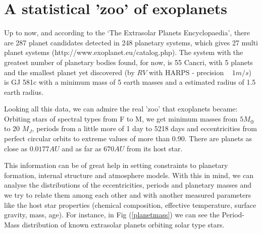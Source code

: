 \documentclass[dvips,12pt,a4paper]{report}
\begin{document}

\section {A statistical 'zoo' of exoplanets}

\indent Up to now, and according to the `The Extrasolar Planets Encyclopaedia', there are 287 planet candidates detected in 248 planetary systems, which gives 27 multi planet systems (http://www.exoplanet.eu/catalog.php). The system with the greatest number of planetary bodies found, for now, is 55 Cancri, with 5 planets \citep{Fischer-2008} and the smallest planet yet discovered (by $RV$ with HARPS - precision ~ $1m/s$) is GJ 581c \citep{Udry-2007b} with a minimum mass of 5 earth masses and a estimated radius of 1.5 earth radius. 

Looking all this data, we can admire the real 'zoo' that exoplanets became: Orbiting stars of spectral types from F to M, we get minimum masses from $5 M_{\oplus}$ to 20 $M_J$, periods from a little more of 1 day to 5218 days and eccentricities from perfect circular orbits to extreme values of more than 0.90. There are planets as close as $0.0177 AU$ and as far as $670 AU$ from its host star.

This information can be of great help in setting constraints to planetary formation, internal structure and atmosphere models. With this in mind, we can analyse the distributions of the eccentricities, periods and planetary masses and we try to relate them among each other and with another measured parameters like the host star properties (chemical composition, effective temperature, surface gravity, mass, age). For instance, in Fig (\ref{planetmass}) we can see the Period-Mass distribution of known extrasolar planets orbiting solar type stars.
\end{document}

